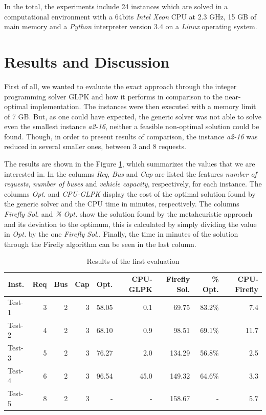 \documentclass[tuberlin,cic,tc,openright,english,noabntcite,oneside]{iiufrgs}
\begin{document}
In the total, the experiments include 24 instances which are solved in a computational environment with a 64bits \emph{Intel Xeon} CPU at 2.3 GHz, 15 GB of main memory and a \emph{Python} interpreter version 3.4 on a \emph{Linux} operating system.

\section{Results and Discussion}
First of all, we wanted to evaluate the exact approach through the integer programming solver GLPK and how it performs in comparison to the near-optimal implementation. The instances were then executed with a memory limit of 7 GB. But, as one could have expected, the generic solver was not able to solve even the smallest instance \emph{a2-16}, neither a feasible non-optimal solution could be found. Though, in order to present results of comparison, the instance \emph{a2-16} was reduced in several smaller ones, between 3 and 8 requests.

The results are shown in the Figure \ref{tab:evaluation-1}, which summarizes the values that we are interested in. In the columns \emph{Req}, \emph{Bus} and \emph{Cap} are listed the features \emph{number of requests}, \emph{number of buses} and \emph{vehicle capacity}, respectively, for each instance. The columns \emph{Opt.} and \emph{CPU-GLPK} display the cost of the optimal solution found by the generic solver and the CPU time in minutes, respectively. The columns \emph{Firefly Sol.} and \emph{\% Opt.} show the solution found by the metaheuristic approach and its deviation to the optimum, this is calculated by simply dividing the value in \emph{Opt.} by the one \emph{Firefly Sol.}. Finally, the time in minutes of the solution through the Firefly algorithm can be seen in the last column.
\begin{table}[H]
\centering
\caption{Results of the first evaluation}
\begin{tabular}{l | r | r | r | r | r | r | r | r}
\hline
Inst. & Req & Bus & Cap & Opt. & CPU-GLPK & Firefly Sol. & \% Opt. & CPU-Firefly\\
\hline
Test-1 & 	3 & 	2 & 	3 & 	58.05 & 	0.1 & 	69.75 & 	83.2\% & 	7.4 \\
Test-2 & 	4 & 	2 & 	3 & 	68.10 & 	0.9 & 	98.51 & 	69.1\% & 	11.7 \\
Test-3 & 	5 & 	2 & 	3 & 	76.27 & 	2.0 & 	134.29 & 	56.8\% & 	2.5 \\
Test-4 & 	6 & 	2 & 	3 & 	96.54 & 	45.0 & 	149.32 & 	64.6\% & 	3.3 \\
Test-5 & 	8 & 	2 & 	3 & 	- & 	- & 	158.67 & 	- & 	5.7 \\
\hline
\end{tabular}
\label{tab:evaluation-1}
\end{table}
\end{document}
